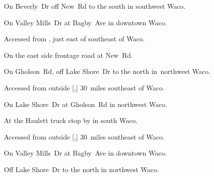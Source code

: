 
\begin{LocationList}

On Beverly~Dr off New~Rd to the south in southwest Waco.

On  Valley Mills~Dr at Bagby~Ave in downtown Waco.

Accessed from , just east of  southeast of Waco.

On the east side  frontage road at New~Rd.

On  Gholson~Rd, off  Lake Shore~Dr to the north in~northwest Waco.

Accessed from  outside [,] 30~miles southeast of Waco.

On  Lake Shore~Dr at  Gholson~Rd in northwest Waco.

At the Haulett truck stop by   in south Waco.

Accessed from  outside [,] 30~miles southeast of Waco.

On  Valley Mills~Dr at Bagby~Ave in downtown Waco.

Off  Lake Shore~Dr to the north in northwest Waco.

\end{LocationList}
